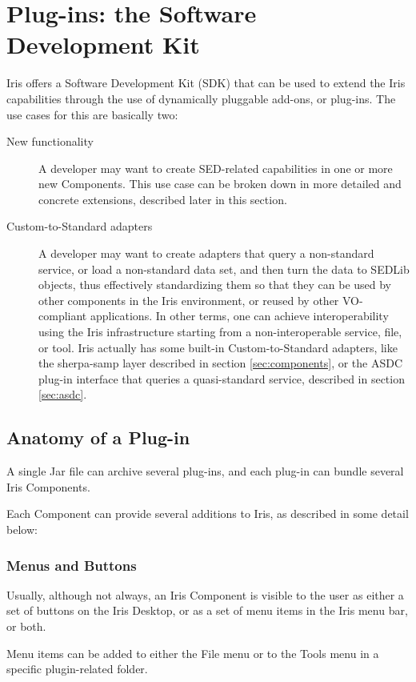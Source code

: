 \section{Plug-ins: the Software Development Kit}
\label{sec:plugins}

Iris offers a Software Development Kit (SDK) that can be used to extend the Iris capabilities through the use of dynamically pluggable add-ons, or plug-ins.
The use cases for this are basically two:
\begin{description}
\item[New functionality] A developer may want to create SED-related capabilities in one or more new Components. This use case can be broken down in more detailed and concrete extensions, described later in this section.
\item[Custom-to-Standard adapters] A developer may want to create adapters that query a non-standard service, or load a non-standard data set, and then turn the data to SEDLib objects, thus effectively standardizing them so that they can be used by other components in the Iris environment, or reused by other VO-compliant applications. In other terms, one can achieve interoperability using the Iris infrastructure starting from a non-interoperable service, file, or tool. Iris actually has some built-in Custom-to-Standard adapters, like the sherpa-samp layer described in section \ref{sec:components}, or the ASDC plug-in interface that queries a quasi-standard service, described in section \ref{sec:asdc}.
\end{description}

\subsection{Anatomy of a Plug-in}
A single Jar file can archive several plug-ins, and each plug-in can bundle several Iris Components.

Each Component can provide several additions to Iris, as described in some detail below:

\subsubsection{Menus and Buttons}
Usually, although not always, an Iris Component is visible to the user as either a set of buttons on the Iris Desktop, or as a set of menu items in the Iris menu bar, or both.

Menu items can be added to either the File menu or to the Tools menu in a specific plugin-related folder.

